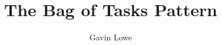 \documentclass[notes,color]{sepslide0}
\title{The Bag of Tasks Pattern}
\author{Gavin Lowe}
\begin{document}
\begin{slide}
  
  \Title

\end{slide}

\end{document}
